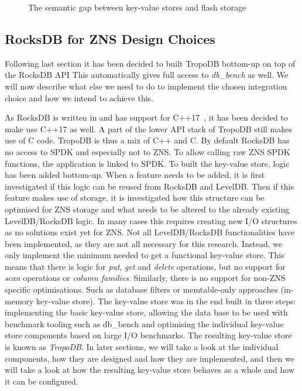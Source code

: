 \begin{figure}[h]
\centering
\begin{minipage}{1.0\textwidth}
  \centering
  
\end{minipage}%
\caption{ The semantic gap between key-value stores and flash storage }
\label{fig:layers}
\end{figure}

\subsection{RocksDB for ZNS Design Choices}
Following last section it has been decided to  built TropoDB bottom-up on top of the RocksDB API This automatically gives full access to \textit{db\_bench} as well. We will now describe what else we need to do to implement the chosen integration choice and how we intend to achieve this.

As RocksDB is written in and has support for C++17~\cite{iso2017iso}, it has been decided to make use C++17 as well. A part of the lower API stack of TropoDB still makes use of C code. TropoDB is thus a mix of C++ and C. By default RocksDB has no access to SPDK and especially not to ZNS. To allow calling raw ZNS SPDK functions, the application is linked to SPDK. To built the key-value store, logic has been added bottom-up. When a feature needs to be added, it is first investigated if this logic can be reused from RocksDB and LevelDB. Then if this feature makes use of storage, it is investigated how this structure can be optimised for ZNS storage and what needs to be altered to the already existing LevelDB/RocksDB logic. In many cases this requires creating new I/O structures as no solutions exist yet for ZNS. 
Not all LevelDB/RocksDB functionalities have been implemented, as they are not all necessary for this research. Instead, we only implement the minimum needed to get a functional key-value store. This means that there is logic for \textit{put}, \textit{get} and \textit{delete} operations, but no support for \textit{scan} operations or \textit{column families}. Similarly, there is no support for non-ZNS specific optimisations. Such as database filters or memtable-only approaches (in-memory key-value store). The key-value store was in the end built in three steps: implementing the basic key-value store, allowing the data base to be used with benchmark tooling such as db\_bench and optimising the individual key-value store components based on large I/O benchmarks. The resulting key-value store is known as \textit{TropoDB}. In later sections, we will take a look at the individual components, how they are designed and how they are implemented, and then we will take a look at how the resulting key-value store behaves as a whole and how it can be configured.

